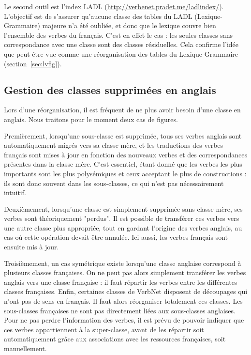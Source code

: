 Le second outil est l'index LADL (\url{http://verbenet.pradet.me/ladlindex/}).
L'objectif est de s'assurer qu'aucune classe des tables du LADL
(Lexique-Grammaire) majeure n'a été oubliée, et donc que le lexique couvre bien
l'ensemble des verbes du français. C'est en effet le cas : les seules classes
sans correspondance avec une classe \verbenet{} sont des classes résiduelles.
Cela confirme l'idée que \verbenet{} peut être vue comme une réorganisation des
tables du Lexique-Grammaire (section~\ref{sec:lvflg}).

\subsection{Gestion des classes supprimées en anglais}

Lors d'une réorganisation, il est fréquent de ne plus avoir besoin d'une classe
en anglais. Nous traitons pour le moment deux cas de figures.

Premièrement, lorsqu'une sous-classe est supprimée, tous ses verbes anglais
sont automatiquement migrés vers sa classe mère, et les traductions des verbes
français sont mises à jour en fonction des nouveaux verbes et des
correspondances présentes dans la classe mère. C'est essentiel, étant donné que
les verbes les plus importants sont les plus polysémiques et ceux acceptant le
plus de constructions : ils sont donc souvent dans les sous-classes, ce qui
n'est pas nécessairement intuitif.

Deuxièmement, lorsqu'une classe est simplement supprimée sans classe mère, ses
verbes sont théoriquement "perdus". Il est possible de transférer ces verbes
vers une autre classe plus appropriée, tout en gardant l'origine des verbes
anglais, au cas où cette opération devait être annulée. Ici aussi, les verbes
français sont ensuite mis à jour.

Troisièmement, un cas symétrique existe lorsqu'une classe anglaise correspond à
plusieurs classes françaises. On ne peut pas alors simplement transférer les
verbes anglais vers une classe française : il faut répartir les verbes entre
les différentes classes françaises. Enfin, certaines classes de VerbNet
disposent de découpages qui n'ont pas de sens en français. Il faut alors
réorganiser totalement ces classes. Les sous-classes françaises ne sont pas
directement liées aux sous-classes anglaises. Pour ne pas perdre l'information
des verbes, il est prévu de pouvoir indiquer que ces verbes appartiennent à la
super-classe, avant de les répartir soit automatiquement grâce aux associations
avec les ressources françaises, soit manuellement.

